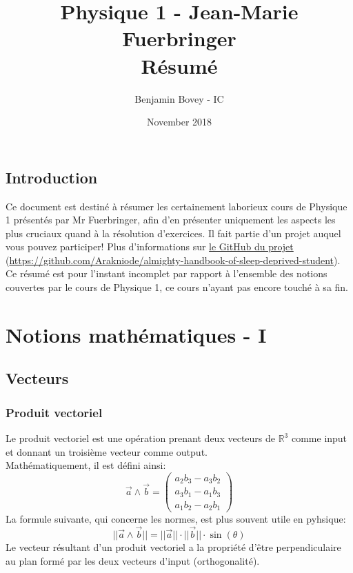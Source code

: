 \documentclass{article}
\title{\vspace{-1.5cm} Physique 1 - Jean-Marie Fuerbringer \\ Résumé}
\author{Benjamin Bovey - IC}
\date{November 2018}
\numberwithin{equation}{section}
\begin{document}
\maketitle

\subsection*{Introduction}
Ce document est destiné à résumer les certainement laborieux cours de Physique 1 présentés par Mr Fuerbringer, afin d'en présenter uniquement les aspects les plus cruciaux quand à la résolution d'exercices. Il fait partie d'un projet auquel vous pouvez participer! Plus d'informations sur \href{https://github.com/Arakniode/almighty-handbook-of-sleep-deprived-student}{le GitHub du projet} (\url{https://github.com/Arakniode/almighty-handbook-of-sleep-deprived-student}). \\
Ce résumé est pour l'instant incomplet par rapport à l'ensemble des notions couvertes par le cours de Physique 1, ce cours n'ayant pas encore touché à sa fin. 

\section{Notions mathématiques - I}

\subsection{Vecteurs}

\subsubsection{Produit vectoriel}

Le produit vectoriel est une opération prenant deux vecteurs de \(\mathbb{R}^3\) comme input et donnant un troisième vecteur comme output. \\ %
Mathématiquement, il est défini ainsi:
\begin{equation}
	\vec a \wedge \vec b = \begin{pmatrix}a_2b_3 - a_3b_2 \\ a_3b_1 - a_1b_3 \\ a_1b_2 - a_2b_1\end{pmatrix}
\end{equation}
La formule suivante, qui concerne les normes, est plus souvent utile en pyhsique:
\begin{equation}
	\boxed{ ||\vec a \wedge \vec b|| = ||\vec a|| \cdot ||\vec b|| \cdot \sin(\theta) }
\end{equation}
Le vecteur résultant d'un produit vectoriel a la propriété d'être perpendiculaire au plan formé par les deux vecteurs d'input (orthogonalité). \\
\end{document}
